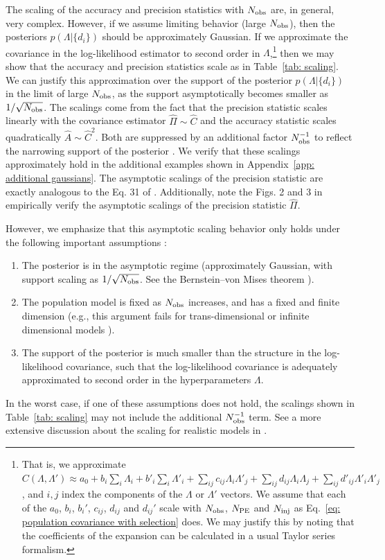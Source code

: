 The scaling of the accuracy and precision statistics with $N_{\rm obs}$ are, in general, very complex. However, if we assume limiting behavior (large $N_{\rm obs}$), then the posteriors $p(\Lambda | \{d_i\})$ should be approximately Gaussian. If we approximate the covariance in the log-likelihood estimator to second order in $\Lambda$,\footnote{That is, we approximate $C(\Lambda, \Lambda') \approx a_0 + b_i\sum_i\Lambda_{i} + b'_i\sum_i\Lambda'_{i} + \sum_{ij}c_{ij}\Lambda_i\Lambda'_j + \sum_{ij}d_{ij}\Lambda_i\Lambda_j + \sum_{ij}d'_{ij}\Lambda'_i\Lambda'_j$, and $i,j$ index the components of the $\Lambda$ or $\Lambda'$ vectors. We assume that each of the $a_0$, $b_i$, $b_i'$, $c_{ij}$, $d_{ij}$ and $d_{ij}'$ scale with $N_{\rm obs}$, $N_{\rm PE}$ and $N_{\rm inj}$ as Eq.~\ref{eq: population covariance with selection} does. 
We may justify this by noting that the coefficients of the expansion can be calculated in a usual Taylor series formalism.} 
then we may show that the accuracy and precision statistics scale as in Table~\ref{tab: scaling}.
We can justify this approximation over the support of the posterior $p(\Lambda | \{d_i\})$ in the limit of large $N_{\rm obs}$, as the support asymptotically becomes smaller as $1/\sqrt{N_{\rm obs}}$. The scalings come from the fact that the precision statistic scales linearly with the covariance estimator $\hat{\Pi} \sim \hat{C}$ and the accuracy statistic scales quadratically $\hat{A} \sim \hat{C}^2$. Both are suppressed by an additional factor $N_{\rm obs}^{-1}$ to reflect the narrowing support of the posterior \cite{Essick:2022ojx, Gair:2022fsj}. We verify that these scalings approximately hold in the additional examples shown in Appendix~\ref{app: additional gaussians}. The asymptotic scalings of the precision statistic are exactly analogous to the Eq. 31 of \citet{Essick:2022ojx}. Additionally, note the Figs. 2 and 3 in \citet{Essick:2022ojx} empirically verify the asymptotic scalings of the precision statistic $\hat{\Pi}$.

However, we emphasize that this asymptotic scaling behavior only holds under the following important assumptions \cite{Gair:2022fsj}:
\begin{enumerate}
    \item The posterior is in the asymptotic regime (approximately Gaussian, with support scaling as $1/\sqrt{N_{\rm obs}}$. See the Bernstein--von Mises theorem \citep{Kleijn:2012bvm, Gair:2022fsj}).
    \item The population model is fixed as $N_{\rm obs}$ increases, and has a fixed and finite dimension (e.g., this argument fails for trans-dimensional or infinite dimensional models \citep{Freedman:1999bvm, Miller:2013ipy, ghosal2017fundamentals}).
    \item The support of the posterior is much smaller than the structure in the log-likelihood covariance, such that the log-likelihood covariance is adequately approximated to second order in the hyperparameters $\Lambda$.
\end{enumerate}
In the worst case, if one of these assumptions does not hold, the scalings shown in Table~\ref{tab: scaling} may not include the additional $N_{\rm obs}^{-1}$ term. See a more extensive discussion about the scaling for realistic models in \citet{Talbot:2023pex}. 

